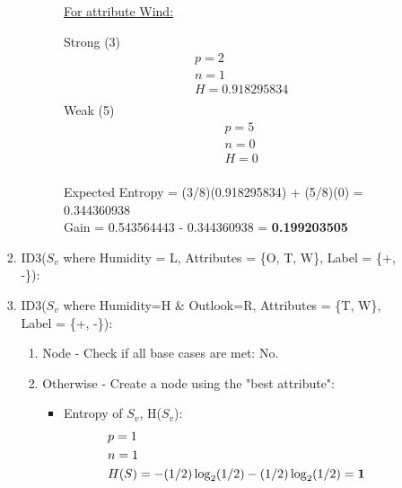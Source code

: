 \documentclass[8pt, fullpage,letterpaper]{article}
\begin{document}
\begin{enumerate}
\begin{enumerate}
\begin{enumerate}
\begin{enumerate}
\begin{itemize}
						\underline {For attribute Wind:} 
							\vspace{-5pt}
							\begin{multicols}{2}
								Strong (3)
			 						\begin{align*}
									    	& p = 2\\
										& n = 1 \\
									    	& H = 0.918295834\\
								      \end{align*}
								Weak (5)
			 						\begin{align*}
									    	& p = 5\\
										& n = 0 \\
									    	& H = 0\\
								      \end{align*}
							\end{multicols}
							\vspace{-20pt}
							Expected Entropy = (3/8)(0.918295834) + (5/8)(0) = 0.344360938\\
							Gain = 0.543564443 - 0.344360938 = {\bf 0.199203505}\\

					\centerline{}	
				\end{itemize}	
			\end{enumerate}


	 	\item ID3($S_v$ where Humidity = L, Attributes = \{O, T, W\}, Label = \{+, -\}): 
				\centerline{}	


	 	\item ID3($S_v$ where Humidity=H \& Outlook=R, Attributes = \{T, W\}, Label = \{+, -\}): 
			\begin{enumerate}
			\item Node - Check if all base cases are met: {\color{red} No}.
			\item Otherwise - Create a node using the "best attribute":
				\begin{itemize}
					\item Entropy of $S_v$, H($S_v$):
						\begin{align*}
						    	& p = 1\\
							& n = 1 \\
						    	& H(S) = - (1/2) \log_2 (1/2) - (1/2) \log_2 (1/2) = {\bf 1}
					      \end{align*}


\end{itemize}
\end{enumerate}
\end{enumerate}
\end{enumerate}
\end{enumerate}
\end{document}
